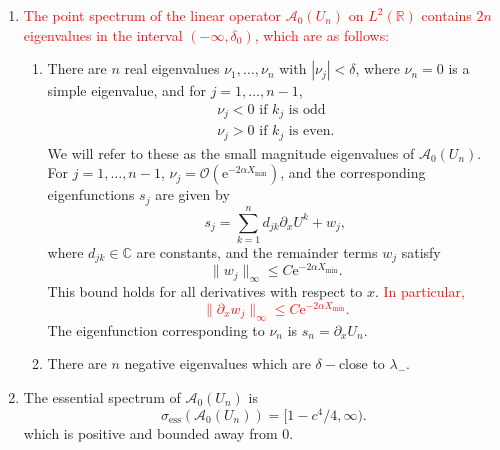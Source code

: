 \documentclass[review,onefignum,onetabnum]{siamart171218}
\newcommand{\C}{\mathbb{C}}
\newcommand{\R}{\mathbb{R}}
\newcommand{\rme}{\mathrm{e}}
\newcommand{\calA}{\mathcal{A}}
\newcommand{\revised}[1]{ \textcolor{red}{#1} }
\begin{document}
\begin{theorem}
\begin{enumerate}
	\item \revised{ The point spectrum of the linear operator $\calA_0(U_n)$ on $L^2(\R)$ contains $2n$ eigenvalues in the interval $(-\infty, \delta_0)$, which are as follows:}
  \begin{enumerate}
    \item There are $n$ real eigenvalues $\nu_1, \dots, \nu_n$ with $|\nu_j| < \delta$, where $\nu_n = 0$ is a simple eigenvalue, and for $j = 1, \dots, n-1$,
    \[
  	\begin{array}{l}
  	\nu_j < 0 \text{ if } k_j \text{ is odd} \\
  	\nu_j > 0 \text{ if } k_j \text{ is even.}
  	\end{array}
    \]
    We will refer to these as the small magnitude eigenvalues of $\calA_0(U_n)$. For $j = 1, \dots, n-1$, $\nu_j = \mathcal{O}(\rme^{-2\alpha X_{\mathrm{min}}})$, and the corresponding eigenfunctions $s_j$ are given by
  	\begin{equation}\label{sj}
  	s_j = \sum_{k = 1}^{n} d_{jk}\partial_x U^k + w_j,
  	\end{equation}
  	where $d_{jk} \in \C$ are constants, and the remainder terms $w_j$ satisfy
  	\begin{equation}\label{sjwbound}
  	\|w_j\|_\infty \leq C\rme^{-2 \alpha X_{\mathrm{min}}}.
  	\end{equation}
    This bound holds for all derivatives with respect to $x$.
    \revised{
    In particular,
    \[
    \| \partial_x w_j\|_\infty \leq C\rme^{-2 \alpha X_{\mathrm{min}}}.
    \]
    }
    The eigenfunction corresponding to $\nu_n$ is $s_n = \partial_x U_n$.

    \item There are $n$ negative eigenvalues which are $\delta-$close to $\lambda_-$.
  \end{enumerate}

  \item The essential spectrum of $\calA_0(U_n)$ is
    \begin{equation}\label{A0ess}
    \sigma_{\text{ess}}(\calA_0(U_n)) = [1 - c^4/4, \infty).
    \end{equation}
    which is positive and bounded away from 0.

\end{enumerate}
\end{theorem}
\end{document}
